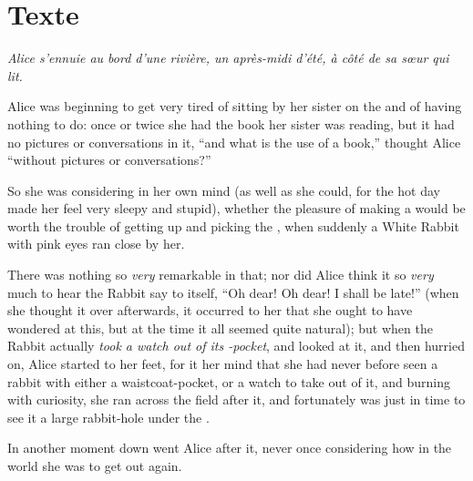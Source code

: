 \documentclass[troisieme]{fiche}
\begin{document}
\newpage
\section{Texte}

\noindent\small\textit{Alice s'ennuie au bord d'une rivière, un après-midi d'été, à côté de
sa sœur qui lit.}\normalsize

\begin{texte}
Alice was beginning to get very tired of sitting by her sister on the
 and of having nothing to do: once or twice she had
 the book her sister was reading, but
it had no pictures or conversations in it, ``and what is the use of a book,'' thought Alice
``without pictures or conversations?''

So she was considering in her own mind (as well as she could, for the hot day made her feel
very sleepy and stupid), whether the pleasure of making a  would be worth the trouble of getting up and picking the
, when suddenly a White Rabbit with pink eyes ran close
by her.

There was nothing so \emph{very} remarkable in that; nor did Alice think it so \emph{very}
much  to hear the Rabbit
say to itself, ``Oh dear! Oh dear! I shall be late!'' (when she thought it over afterwards, it
occurred to her that she ought to have wondered at this, but at the time it all seemed quite
natural); but when the Rabbit actually \emph{took a watch out of its
-pocket}, and looked at it, and then hurried on, Alice
started to her feet, for it 
her mind that she had never before seen a rabbit with either a waistcoat-pocket, or a watch to
take out of it, and burning with curiosity, she ran across the field after it, and fortunately
was just in time to see it  a large rabbit-hole
under the .

In another moment down went Alice after it, never once considering how in the world she was
to get out again.
\end{texte}
\end{document}
